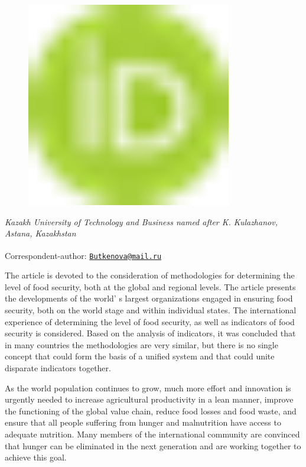 {\begin{figure}[H]
	\centering
	\includegraphics[width=0.8\textwidth]{media/ekon3/image1}
	\caption*{}
\end{figure}


\emph{Kazakh University of Technology and Business named after K.
Kulazhanov, Astana, Kazakhstan}

{\bfseries \textsuperscript{\envelope }}Correspondent-author:
\href{mailto:Butkenova@mail.ru}{\nolinkurl{Butkenova@mail.ru}}

The article is devoted to the consideration of methodologies for
determining the level of food security, both at the global and regional
levels. The article presents the developments of the
world' s largest organizations engaged in ensuring food
security, both on the world stage and within individual states. The
international experience of determining the level of food security, as
well as indicators of food security is considered. Based on the analysis
of indicators, it was concluded that in many countries the methodologies
are very similar, but there is no single concept that could form the
basis of a unified system and that could unite disparate indicators
together.

As the world population continues to grow, much more effort and
innovation is urgently needed to increase agricultural productivity in a
lean manner, improve the functioning of the global value chain, reduce
food losses and food waste, and ensure that all people suffering from
hunger and malnutrition have access to adequate nutrition. Many members
of the international community are convinced that hunger can be
eliminated in the next generation and are working together to achieve
this goal.

}
